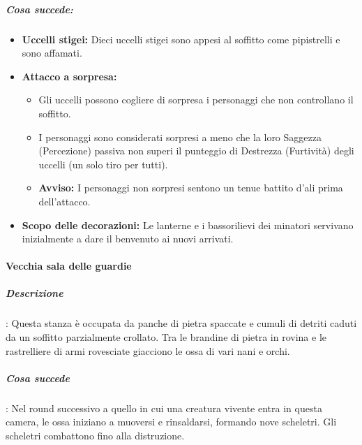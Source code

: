 \documentclass{article}
\begin{document}
\subparagraph{Cosa succede:}
\begin{itemize}
    \item \textbf{Uccelli stigei:} Dieci uccelli stigei sono appesi al soffitto come pipistrelli e sono affamati.
    \item \textbf{Attacco a sorpresa:}
    \begin{itemize}
        \item Gli uccelli possono cogliere di sorpresa i personaggi che non controllano il soffitto.
        \item I personaggi sono considerati sorpresi a meno che la loro Saggezza (Percezione) passiva non superi il punteggio di Destrezza (Furtività) degli uccelli (un solo tiro per tutti).
        \item \textbf{Avviso:} I personaggi non sorpresi sentono un tenue battito d'ali prima dell'attacco.
    \end{itemize}
    \item \textbf{Scopo delle decorazioni:} Le lanterne e i bassorilievi dei minatori servivano inizialmente a dare il benvenuto ai nuovi arrivati.
\end{itemize}

 \paragraph{Vecchia sala delle guardie}

\subparagraph{Descrizione} : 
    Questa stanza è occupata da panche di pietra spaccate e cumuli di detriti caduti da un soffitto parzialmente crollato. Tra le brandine di pietra in rovina e le rastrelliere di armi rovesciate giacciono le ossa di vari nani e orchi. 


\subparagraph{Cosa succede}: Nel round successivo a quello in cui una creatura vivente entra in questa camera, le ossa iniziano a muoversi e rinsaldarsi, formando nove scheletri. Gli scheletri combattono fino alla distruzione.
\end{document}
